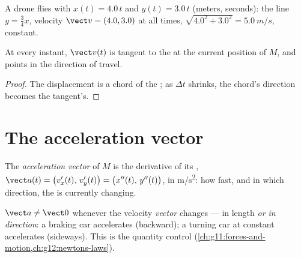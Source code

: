 \begin{example}\label{ex:g12:kinematics-2d:drone}
A drone flies with $x(t) = 4.0\,t$ and $y(t) = 3.0\,t$ (meters,
seconds):  the line $y = \tfrac34 x$, velocity
$\vect v = (4.0, 3.0)$ at all times, 
$\sqrt{4.0^2 + 3.0^2} = \qty{5.0}{m/s}$, constant.
\end{example}

\begin{proposition}\label{prop:g12:kinematics-2d:tangent}
At every instant, $\vect v(t)$ is tangent to the  at the
current position of $M$, and points in the direction of travel.
\end{proposition}

\begin{proof}
The displacement is a chord of the ; as $\Delta t$ shrinks,
the chord's direction becomes the tangent's.
\end{proof}

\section{The acceleration vector}

\begin{definition}\label{def:g12:kinematics-2d:acceleration}
The \emph{acceleration vector} of $M$ is
the derivative of its ,
$\vect a(t) = \bigl(v_x'(t),\, v_y'(t)\bigr) =
\bigl(x''(t),\, y''(t)\bigr)$, in \unit{m/s^2}: how fast, and in
which direction, the  is currently changing.
\end{definition}

\begin{remark}\label{rem:g12:kinematics-2d:turning}
$\vect a \neq \vect 0$ whenever the velocity \emph{vector} changes
--- in length \emph{or in direction}: a braking car accelerates
(backward); a turning car at constant  accelerates (sideways).
This is the quantity  control
(\cref{ch:g11:forces-and-motion,ch:g12:newtons-laws}).
\end{remark}


